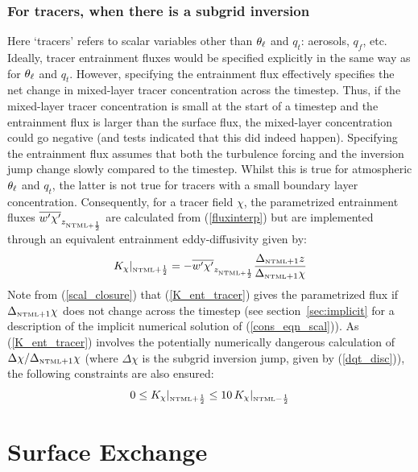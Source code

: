 \documentclass{UMDP_article}
\begin{document}
\subsubsection{For tracers, when there is a subgrid inversion}
\label{sec:ent_K_flux}
Here `tracers' refers to scalar variables other than $\theta_{\ell}$ and
$q_t$: aerosols, $q_f$, etc.  Ideally, tracer entrainment fluxes would
be specified explicitly in the same way as for $\theta_{\ell}$ and $q_t$.
However, specifying the entrainment flux effectively specifies the net
change in mixed-layer tracer concentration across the timestep.  Thus,
if the mixed-layer tracer concentration is small at the start of a
timestep and the entrainment flux is larger than the surface flux, the
mixed-layer concentration could go negative (and tests indicated that
this did indeed happen).  Specifying the entrainment flux assumes that
both the turbulence forcing and the inversion jump change slowly
compared to the timestep.  Whilst this is true for atmospheric
$\theta_{\ell}$ and $q_t$, the latter is not true for tracers with a small
boundary layer concentration.  Consequently, for a tracer field
$\chi$, the parametrized entrainment fluxes $\overline{w'\chi'}_{
  z_{\mbox{\tiny \rm NTML}+\frac{1}{2}} }$ are calculated from (\ref{fluxinterp}) but
are implemented through an equivalent entrainment eddy-diffusivity
given by:
\begin{equation}
  K_{\chi}|_{\mbox{\tiny \rm NTML}+\frac{1}{2}} = - \overline{w'\chi'}_{ z_{\mbox{\tiny \rm NTML}+\frac{1}{2}} }
                           \frac{\Delta_{\mbox{\tiny \rm NTML}+1} z}{\Delta_{\mbox{\tiny \rm NTML}+1} \chi} 
  \label{K_ent_tracer}
\end{equation}
Note from (\ref{scal_closure}) that (\ref{K_ent_tracer}) gives the
parametrized flux if $\Delta_{\mbox{\tiny \rm NTML}+1} \chi$ does not change across
the timestep (see section~\ref{sec:implicit} for a description of the
implicit numerical solution of (\ref{cons_eqn_scal})).  As
(\ref{K_ent_tracer}) involves the potentially numerically dangerous
calculation of $\Delta \chi/\Delta_{\mbox{\tiny \rm NTML}+1} \chi$ (where $\Delta
\chi$ is the subgrid inversion jump, given by (\ref{dqt_disc})), the
following constraints are also ensured:
\begin{equation*}
     0 \leq K_{\chi}|_{\mbox{\tiny \rm NTML}+\frac{1}{2}} 
  \leq 10 \,K_{\chi}|_{\mbox{\tiny \rm NTML}-\frac{1}{2}} 
\end{equation*}

\section{Surface Exchange}
\end{document}
